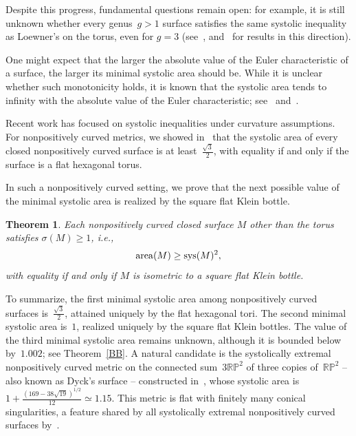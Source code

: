 \documentclass[12pt,reqno]{amsart}
\newtheorem{theoremABC}{Theorem}
\theoremstyle{definition}
\numberwithin{equation}{section}
\DeclareMathOperator{\area}{{\rm area}}
\DeclareMathOperator{\sys}{{\rm sys}}
\newcommand{\RP}{{\mathbb R\mathbb P}}
\numberwithin{equation}{section}
\begin{document}
Despite this progress, fundamental questions remain open: for example, it is still unknown whether every genus~$g>1$ surface satisfies the same systolic inequality as Loewner's on the torus, even for $g=3$ (see~\cite{KS05}, \cite{KS06b} and~\cite{KS12} for results in this direction).

One might expect that the larger the absolute value of the Euler characteristic of a surface, the larger its minimal systolic area should be.  
While it is unclear whether such monotonicity holds, it is known that the systolic area tends to infinity with the absolute value of the Euler characteristic; see~\cite{gro-frm} and~\cite{KS05}.

\medskip

Recent work has focused on systolic inequalities under curvature
assumptions.  For nonpositively curved metrics, we showed
in~\cite{KS24} that the systolic area of every closed nonpositively
curved surface is at least~$\frac{\sqrt{3}}{2}$, with equality if and
only if the surface is a flat hexagonal torus.

\medskip

In such a nonpositively curved setting, we prove that the next possible
value of the minimal systolic area is realized by the square flat
Klein bottle.

\begin{theoremABC} \label{theo:main}
Each nonpositively curved closed surface $M$ other than the torus
satisfies $\sigma(M) \geq 1$, i.e.,
\[
\area(M)\geq\sys(M)^2,
\]
with equality if and only if $M$ is isometric to a square flat Klein
bottle.
%
\end{theoremABC}

To summarize, the first minimal systolic area among nonpositively
curved surfaces is~$\tfrac{\sqrt{3}}{2}$, attained uniquely by the
flat hexagonal tori.  The second minimal systolic area is~$1$,
realized uniquely by the square flat Klein bottles.  The value of the
third minimal systolic area remains unknown, although it is bounded
below by~$1.002$; see Theorem~\ref{BB}.  A natural candidate is the
systolically extremal nonpositively curved metric on the connected
sum~$3\RP^2$ of three copies of~$\RP^2$ -- also known as Dyck's
surface -- constructed in~\cite{KS15}, whose systolic area is
$1+\frac{(169-38\sqrt{19})^{1/2}}{12} \simeq 1.15$.  This metric is
flat with finitely many conical singularities, a feature shared by all
systolically extremal nonpositively curved surfaces by~\cite{KS21}.
\end{document}
